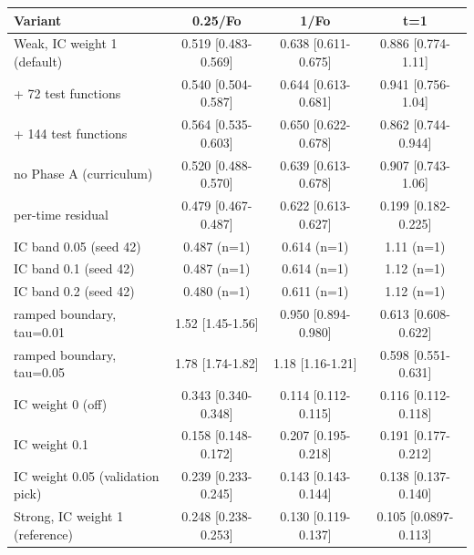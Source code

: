 \begin{tabular}{lccc}
\toprule
Variant & 0.25/Fo & 1/Fo & t=1 \\
\midrule
Weak, IC weight 1 (default) & 0.519 {\scriptsize[0.483-0.569]} & 0.638 {\scriptsize[0.611-0.675]} & 0.886 {\scriptsize[0.774-1.11]} \\
  + 72 test functions & 0.540 {\scriptsize[0.504-0.587]} & 0.644 {\scriptsize[0.613-0.681]} & 0.941 {\scriptsize[0.756-1.04]} \\
  + 144 test functions & 0.564 {\scriptsize[0.535-0.603]} & 0.650 {\scriptsize[0.622-0.678]} & 0.862 {\scriptsize[0.744-0.944]} \\
  no Phase A (curriculum) & 0.520 {\scriptsize[0.488-0.570]} & 0.639 {\scriptsize[0.613-0.678]} & 0.907 {\scriptsize[0.743-1.06]} \\
  per-time residual & 0.479 {\scriptsize[0.467-0.487]} & 0.622 {\scriptsize[0.613-0.627]} & 0.199 {\scriptsize[0.182-0.225]} \\
  IC band 0.05 (seed 42) & 0.487 (n=1) & 0.614 (n=1) & 1.11 (n=1) \\
  IC band 0.1 (seed 42) & 0.487 (n=1) & 0.614 (n=1) & 1.12 (n=1) \\
  IC band 0.2 (seed 42) & 0.480 (n=1) & 0.611 (n=1) & 1.12 (n=1) \\
  ramped boundary, tau=0.01 & 1.52 {\scriptsize[1.45-1.56]} & 0.950 {\scriptsize[0.894-0.980]} & 0.613 {\scriptsize[0.608-0.622]} \\
  ramped boundary, tau=0.05 & 1.78 {\scriptsize[1.74-1.82]} & 1.18 {\scriptsize[1.16-1.21]} & 0.598 {\scriptsize[0.551-0.631]} \\
  IC weight 0 (off) & 0.343 {\scriptsize[0.340-0.348]} & 0.114 {\scriptsize[0.112-0.115]} & 0.116 {\scriptsize[0.112-0.118]} \\
  IC weight 0.1 & 0.158 {\scriptsize[0.148-0.172]} & 0.207 {\scriptsize[0.195-0.218]} & 0.191 {\scriptsize[0.177-0.212]} \\
  IC weight 0.05 (validation pick) & 0.239 {\scriptsize[0.233-0.245]} & 0.143 {\scriptsize[0.143-0.144]} & 0.138 {\scriptsize[0.137-0.140]} \\
Strong, IC weight 1 (reference) & 0.248 {\scriptsize[0.238-0.253]} & 0.130 {\scriptsize[0.119-0.137]} & 0.105 {\scriptsize[0.0897-0.113]} \\
\bottomrule
\end{tabular}

